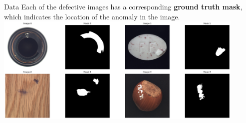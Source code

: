 \documentclass{beamer}
\begin{document}
\begin{frame}{Data}
      Each of the defective images has a corresponding \textbf{ground truth mask},
       which indicates the location of the anomaly in the image.\newline
            \center
       \includegraphics[width=0.9\textwidth]
            {assets/masks}
\end{frame}
\end{document}
